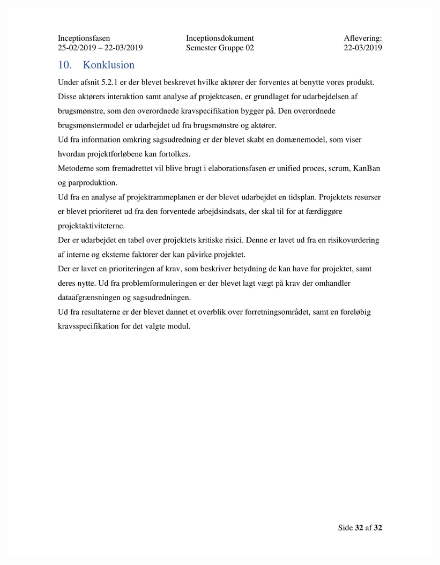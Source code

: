 \begin{figure}[hb]
  \includegraphics[scale = 0.33]{./PNG/Inceptions/Gruppe 02 + InceptionsDokument-33.jpg} 
\end{figure}

